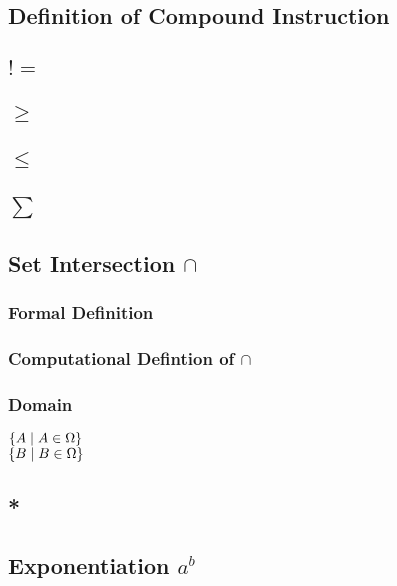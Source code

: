 \documentclass[11pt]{article}
\begin{document}
\subsection{Definition of Compound Instruction}
\subsection{$!=$}
\subsection{$\geq$}
\subsection{$\leq$}
\subsection{$\sum$}




\subsection{Set Intersection $\cap$}
\subsubsection{Formal Definition}
\subsubsection{Computational Defintion of $\cap$}
\subsubsection{Domain}
\begin{center}
$
\{ A \hspace{1mm} | \hspace{1mm} A \in \Omega \}
$
\\ \vspace{2mm}
$
\{ B \hspace{1mm} | \hspace{1mm} B \in \Omega \}
$
\end{center}





\subsection{*}
\subsection{Exponentiation $a^b$}
\end{document}
